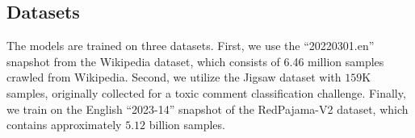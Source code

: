 %


\subsection{Datasets}\label{sec:exp_bertmodels_datasets}
The models are trained on three datasets.
First, we use the ``20220301.en'' snapshot from the Wikipedia dataset, which consists of 6.46 million samples crawled from Wikipedia. Second, we utilize the Jigsaw dataset with $159$K samples, originally collected for a toxic comment classification challenge.
Finally, we train on the English ``2023-14'' snapshot of the RedPajama-V2 dataset, which contains approximately $5.12$ billion samples.

